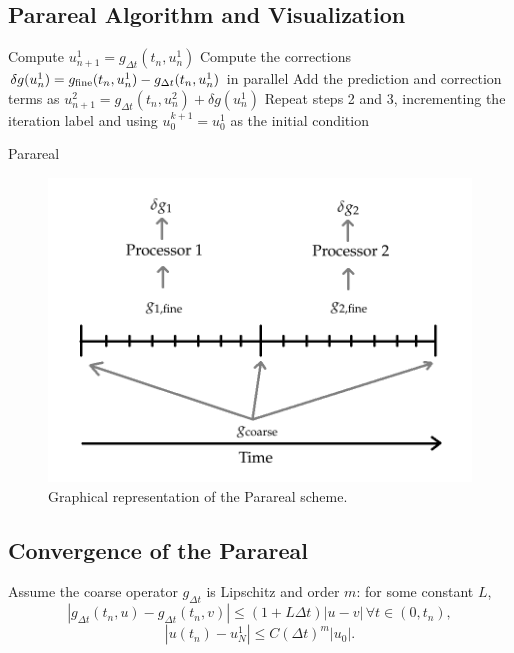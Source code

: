 \documentclass[letterpaper,12pt]{article}
\begin{document}
\subsection{Parareal Algorithm and Visualization}

\begin{algorithm}
    Compute $u^1_{n+1} = g_{\Delta t}(t_n, u^1_n)$\;
    Compute the corrections $\delta g(u^1_n) = g_{\textnormal{fine}}(t_n,
    u^1_n) - g_{\Delta t}(t_n, u^1_n)$ in parallel\;
    Add the prediction and correction terms as $u^2_{n+1} = g_{\Delta t}(t_n,
    u^2_n) + \delta g(u^1_n)$\;
    Repeat steps 2 and 3, incrementing the iteration label and using $u^{k+1}_0
    = u^1_0$ as the initial condition\;
 \caption{Parareal}
 \label{alg:parareal}
\end{algorithm}

\begin{figure}[H]
\begin{center}
\includegraphics[width=0.75\linewidth]{parareal_visualization.png}
\caption{Graphical representation of the Parareal scheme.}
\label{fig:pararealvis}
\end{center}
\end{figure}

\subsection{Convergence of the Parareal}

Assume the coarse operator $g_{\Delta t}$ is Lipschitz and order $m$: for some
constant $L$, 
\[ |g_{\Delta t}(t_n, u) - g_{\Delta t}(t_n, v)| \leq (1 + L \Delta t) |u - v|
\, \forall t \in (0, t_n), \]
\[ |u(t_n) - u^1_N | \leq C(\Delta t)^m |u_0|. \]
\end{document}
